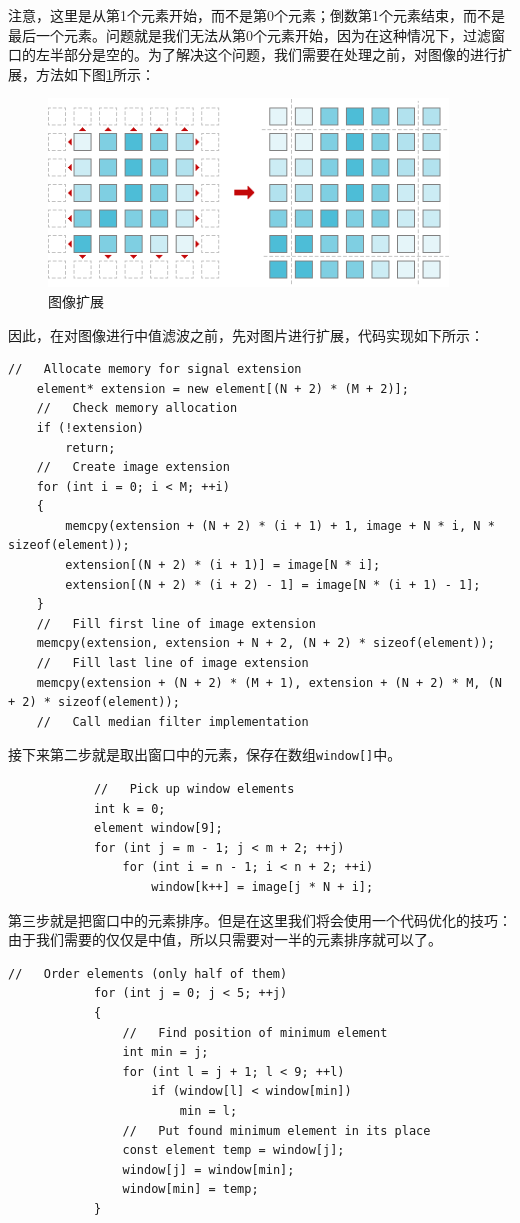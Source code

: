 \documentclass[a4paper]{ctexrep}
\begin{document}
注意，这里是从第1个元素开始，而不是第0个元素；倒数第1个元素结束，而不是最后一个元素。问题就是我们无法从第0个元素开始，因为在这种情况下，过滤窗口的左半部分是空的。为了解决这个问题，我们需要在处理之前，对图像的进行扩展，方法如下图\ref {fig:imgExt}所示：
\begin{figure}[h]
\centering
\includegraphics[height=5cm]{img/extendImg.png}
\caption{图像扩展}
\label{fig:imgExt}
\end{figure}
因此，在对图像进行中值滤波之前，先对图片进行扩展，代码实现如下所示：
\begin{lstlisting}
//   Allocate memory for signal extension
	element* extension = new element[(N + 2) * (M + 2)];
	//   Check memory allocation
	if (!extension)
		return;
	//   Create image extension
	for (int i = 0; i < M; ++i)
	{
		memcpy(extension + (N + 2) * (i + 1) + 1, image + N * i, N * sizeof(element));
		extension[(N + 2) * (i + 1)] = image[N * i];
		extension[(N + 2) * (i + 2) - 1] = image[N * (i + 1) - 1];
	}
	//   Fill first line of image extension
	memcpy(extension, extension + N + 2, (N + 2) * sizeof(element));
	//   Fill last line of image extension
	memcpy(extension + (N + 2) * (M + 1), extension + (N + 2) * M, (N + 2) * sizeof(element));
	//   Call median filter implementation
\end{lstlisting}
接下来第二步就是取出窗口中的元素，保存在数组\lstinline{window[]}中。
\begin{lstlisting}
			//   Pick up window elements
			int k = 0;
			element window[9];
			for (int j = m - 1; j < m + 2; ++j)
				for (int i = n - 1; i < n + 2; ++i)
					window[k++] = image[j * N + i];
\end{lstlisting}

第三步就是把窗口中的元素排序。但是在这里我们将会使用一个代码优化的技巧：由于我们需要的仅仅是中值，所以只需要对一半的元素排序就可以了。

\begin{lstlisting}
//   Order elements (only half of them)
			for (int j = 0; j < 5; ++j)
			{
				//   Find position of minimum element
				int min = j;
				for (int l = j + 1; l < 9; ++l)
					if (window[l] < window[min])
						min = l;
				//   Put found minimum element in its place
				const element temp = window[j];
				window[j] = window[min];
				window[min] = temp;
			}
\end{lstlisting}
\end{document}
